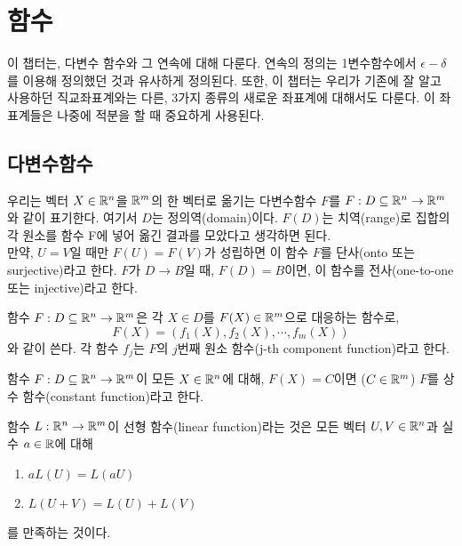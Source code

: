 \section{함수}

이 챕터는, 다변수 함수와 그 연속에 대해 다룬다. 연속의 정의는 1변수함수에서 $\epsilon-\delta$를 이용해 정의했던 것과 유사하게 정의된다. 또한, 이 챕터는 우리가 기존에 잘 알고 사용하던 직교좌표계와는 다른, 3가지 종류의 새로운 좌표계에 대해서도 다룬다. 이 좌표계들은 나중에 적분을 할 때 중요하게 사용된다.

\subsection{다변수함수}

우리는 벡터 $X \in \mathbb{R}^n$을 $\mathbb{R}^m$의 한 벡터로 옮기는 다변수함수 $F$를 $F:D \subseteq \mathbb{R}^n \to \mathbb{R}^m$와 같이 표기한다. 여기서 $D$는 정의역(domain)이다. $F(D)$는 치역(range)로 집합의 각 원소를 함수 F에 넣어 옮긴 결과를 모았다고 생각하면 된다.\\
만약, $U=V$일 때만 $F(U)=F(V)$가 성립하면 이 함수 $F$를 단사(onto 또는 surjective)라고 한다. $F$가 $D \to B$일 때, $F(D)=B$이면, 이 함수를 전사(one-to-one 또는 injective)라고 한다.

\begin{definition}[다변수 함수]
함수 $F:D \subseteq \mathbb{R}^n \to \mathbb{R}^m$은 각 $X \in D$를 $F(X) \in \mathbb{R}^m$으로 대응하는 함수로,
$$F(X)=(f_1(X),f_2(X),\cdots,f_m(X))$$
와 같이 쓴다. 각 함수 $f_j$는 $F$의 $j$번째 원소 함수(j-th component function)라고 한다.
\end{definition}

\begin{definition}[상수 함수]
함수 $F: D \subseteq \mathbb{R}^n \to \mathbb{R}^m$이 모든 $X \in \mathbb{R}^n$에 대해, $F(X)=C$이면 ($C \in \mathbb{R}^m$) $F$를 상수 함수(constant function)라고 한다.
\end{definition}

\begin{definition}[선형 함수]
함수 $L: \mathbb{R}^n \to \mathbb{R}^m$이 선형 함수(linear function)라는 것은 모든 벡터 $U, V \in \mathbb{R}^n$과 실수 $a \in \mathbb{R}$에 대해
\begin{enumerate}
    \item $aL(U)=L(aU)$
    \item $L(U+V)=L(U)+L(V)$
\end{enumerate}
를 만족하는 것이다.
\end{definition}

